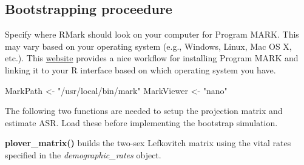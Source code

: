 \documentclass[]{article}
\newenvironment{Shaded}{\begin{snugshade}}{\end{snugshade}}
\newcommand{\StringTok}[1]{\textcolor[rgb]{0.31,0.60,0.02}{{#1}}}
\newcommand{\NormalTok}[1]{{#1}}
\begin{document}
\subsection{Bootstrapping proceedure}\label{bootstrapping-proceedure}

Specify where RMark should look on your computer for Program MARK. This
may vary based on your operating system (e.g., Windows, Linux, Mac OS X,
etc.). This \href{http://www.phidot.org/software/mark/rmark/}{website}
provides a nice workflow for installing Program MARK and linking it to
your R interface based on which operating system you have.

\begin{Shaded}
\begin{Highlighting}[]
\NormalTok{MarkPath <-}\StringTok{ "/usr/local/bin/mark"}
\NormalTok{MarkViewer <-}\StringTok{ "nano"}
\end{Highlighting}
\end{Shaded}

The following two functions are needed to setup the projection matrix
and estimate ASR. Load these before implementing the bootstrap
simulation.

\textbf{plover\_matrix()} builds the two-sex Lefkovitch matrix using the
vital rates specified in the \emph{demographic\_rates} object.
\end{document}
